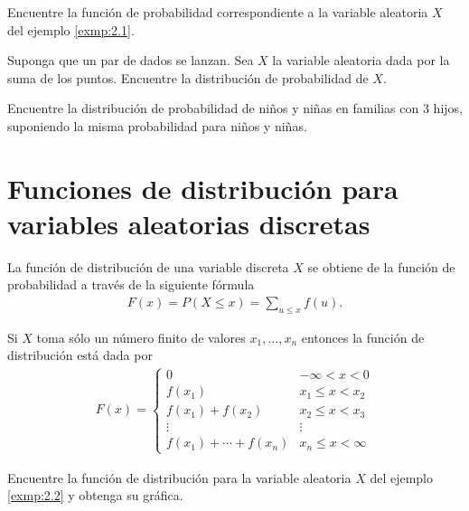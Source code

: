 	\begin{exmp}
		\label{exmp:2.2}
		Encuentre la función de probabilidad correspondiente a la variable aleatoria $X$ del ejemplo \ref{exmp:2.1}.
	\end{exmp}



 \begin{exmp}
  \label{sol:2.1}
  Suponga que un par de dados se lanzan. Sea $X$ la variable aleatoria dada por la suma de los puntos. Encuentre la distribución de probabilidad de $X.$
 \end{exmp}



 \begin{exmp}
  \label{sol:2.2}
  Encuentre la distribución de probabilidad de niños y niñas en familias con 3 hijos, suponiendo la misma probabilidad para niños y niñas.
 \end{exmp}



\section{Funciones de distribución para variables aleatorias discretas}


	La función de distribución de una variable discreta $X$ se obtiene de la función de probabilidad a través de la siguiente fórmula
	\begin{align}
		\label{2.4}
		F(x) = P(X\leq x) = \sum_{u \leq x} f(u).
	\end{align}



	Si $X$ toma sólo un número finito de valores $x_{1},...,x_{n}$ entonces la función de distribución está dada por
	\begin{align}
		\label{2.5}
		F(x)=
		\begin{cases}
			0 & -\infty < x < 0 \\
			f(x_{1}) & x_{1} \leq x < x_{2} \\
			f(x_{1})+f(x_{2}) & x_{2} \leq x < x_{3} \\
			\vdots & \vdots \\
			f(x_{1})+\cdots+f(x_{n}) & x_{n} \leq x < \infty
		\end{cases}
	\end{align}



	\begin{exmp}
		\label{exmp:2.3}
		Encuentre la función de distribución para la variable aleatoria $X$ del ejemplo \ref{exmp:2.2} y obtenga su gráfica.
	\end{exmp}



